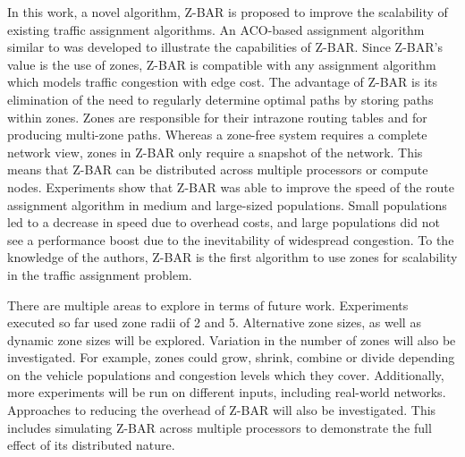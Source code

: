 \documentclass[12pt,conference]{IEEEtran}
\begin{document}
In this work, a novel algorithm, Z-BAR is proposed to improve the scalability of existing traffic assignment algorithms. An ACO-based assignment algorithm similar to \cite{iaco} was developed to illustrate the capabilities of Z-BAR. Since Z-BAR's value is the use of zones, Z-BAR is compatible with any assignment algorithm which models traffic congestion with edge cost. The advantage of Z-BAR is its elimination of the need to regularly determine optimal paths by storing paths within zones. Zones are responsible for their intrazone routing tables and for producing multi-zone paths. Whereas a zone-free system requires a complete network view, zones in Z-BAR only require a snapshot of the network. This means that Z-BAR can be distributed across multiple processors or compute nodes. Experiments show that Z-BAR was able to improve the speed of the route assignment algorithm in medium and large-sized populations. Small populations led to a decrease in speed due to overhead costs, and large populations did not see a performance boost due to the inevitability of widespread congestion. To the knowledge of the authors, Z-BAR is the first algorithm to use zones for scalability in the traffic assignment problem.

There are multiple areas to explore in terms of future work. Experiments executed so far used zone radii of 2 and 5. Alternative zone sizes, as well as dynamic zone sizes will be explored. Variation in the number of zones will also be investigated. For example, zones could grow, shrink, combine or divide depending on the vehicle populations and congestion levels which they cover. Additionally, more experiments will be run on different inputs, including real-world networks. Approaches to reducing the overhead of Z-BAR will also be investigated. This includes simulating Z-BAR across multiple processors to demonstrate the full effect of its distributed nature.
\end{document}
